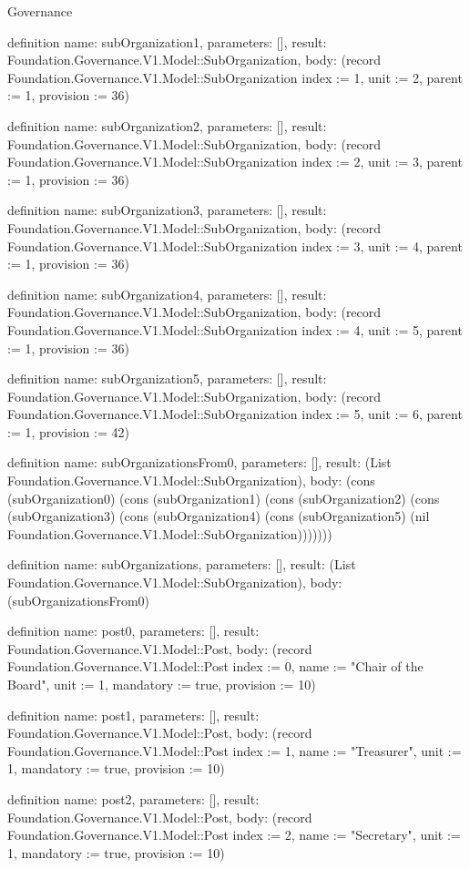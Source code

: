 \begin{lexlean}{Governance}
\begin{semanticmodule}
definition{
  name: subOrganization1,
  parameters: [],
  result: Foundation.Governance.V1.Model::SubOrganization,
  body: (record Foundation.Governance.V1.Model::SubOrganization {index := 1, unit := 2, parent := 1, provision := 36})
}

definition{
  name: subOrganization2,
  parameters: [],
  result: Foundation.Governance.V1.Model::SubOrganization,
  body: (record Foundation.Governance.V1.Model::SubOrganization {index := 2, unit := 3, parent := 1, provision := 36})
}

definition{
  name: subOrganization3,
  parameters: [],
  result: Foundation.Governance.V1.Model::SubOrganization,
  body: (record Foundation.Governance.V1.Model::SubOrganization {index := 3, unit := 4, parent := 1, provision := 36})
}

definition{
  name: subOrganization4,
  parameters: [],
  result: Foundation.Governance.V1.Model::SubOrganization,
  body: (record Foundation.Governance.V1.Model::SubOrganization {index := 4, unit := 5, parent := 1, provision := 36})
}

definition{
  name: subOrganization5,
  parameters: [],
  result: Foundation.Governance.V1.Model::SubOrganization,
  body: (record Foundation.Governance.V1.Model::SubOrganization {index := 5, unit := 6, parent := 1, provision := 42})
}

definition{
  name: subOrganizationsFrom0,
  parameters: [],
  result: (List Foundation.Governance.V1.Model::SubOrganization),
  body: (cons (subOrganization0) (cons (subOrganization1) (cons (subOrganization2) (cons (subOrganization3) (cons (subOrganization4) (cons (subOrganization5) (nil Foundation.Governance.V1.Model::SubOrganization)))))))
}

definition{
  name: subOrganizations,
  parameters: [],
  result: (List Foundation.Governance.V1.Model::SubOrganization),
  body: (subOrganizationsFrom0)
}

definition{
  name: post0,
  parameters: [],
  result: Foundation.Governance.V1.Model::Post,
  body: (record Foundation.Governance.V1.Model::Post {index := 0, name := "Chair of the Board", unit := 1, mandatory := true, provision := 10})
}

definition{
  name: post1,
  parameters: [],
  result: Foundation.Governance.V1.Model::Post,
  body: (record Foundation.Governance.V1.Model::Post {index := 1, name := "Treasurer", unit := 1, mandatory := true, provision := 10})
}

definition{
  name: post2,
  parameters: [],
  result: Foundation.Governance.V1.Model::Post,
  body: (record Foundation.Governance.V1.Model::Post {index := 2, name := "Secretary", unit := 1, mandatory := true, provision := 10})
}


\end{semanticmodule}
\end{lexlean}
